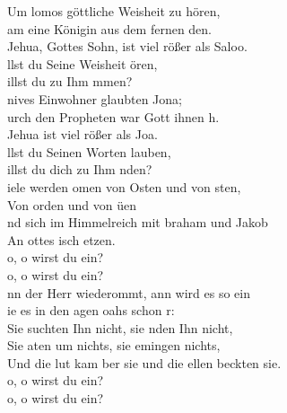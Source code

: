 
Um lomos göttliche Weisheit zu hören,\\
am eine Königin aus dem fernen den.\\
Jehua, Gottes Sohn, ist viel rößer als Saloo.\\
llst du Seine Weisheit ören,\\
illst du zu Ihm mmen?\\

nives Einwohner glaubten Jona;\\
urch den Propheten war Gott ihnen h.\\
Jehua ist viel rößer als Joa.\\
llst du Seinen Worten lauben,\\
illst du dich zu Ihm nden?\\

iele werden omen von Osten und von sten,\\
Von orden und von üen\\
nd sich im Himmelreich mit braham und Jakob\\
An ottes isch etzen.\\

 o, o wirst du ein?\\
 o, o wirst du ein?\\

nn der Herr wiederommt, ann wird es so ein\\
ie es in den agen oahs schon r:\\
Sie suchten Ihn nicht, sie nden Ihn nicht,\\
Sie aten um nichts, sie emingen nichts,\\
Und die lut kam ber sie und die ellen beckten sie.\\

 o, o wirst du ein?\\
 o, o wirst du ein?\\

